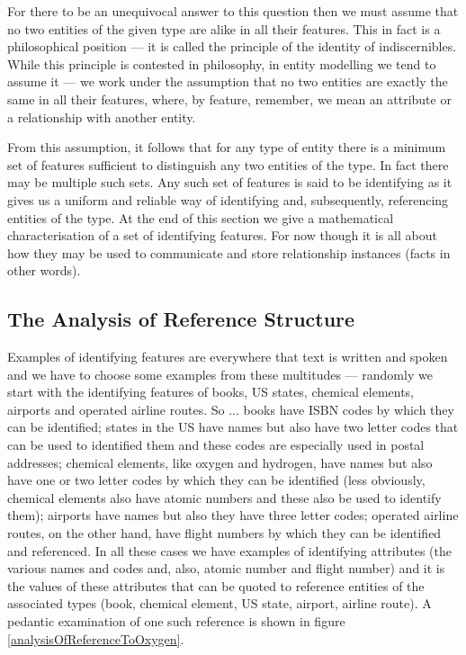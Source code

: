 For there to be an unequivocal answer to this question then we must assume that no two entities of the given type are alike in all their features. This in fact  is a philosophical position 
--- it is called the principle of the identity of indiscernibles. 
While this principle is contested in philosophy, in entity modelling we tend to assume it --- we work under the assumption that no two entities are exactly the same in all their features, where, by feature, remember, we mean an attribute or a relationship with another entity. 

From this assumption, it follows that for any type of entity there is a minimum set of features sufficient to distinguish any two entities of the type. In fact there may be multiple such sets. 
Any such set of features is said to be identifying as it gives us 
a uniform and reliable way of identifying and, subsequently, referencing entities of the type. At the end of this section we give a mathematical characterisation of a set of identifying features. For now though it is all about how they may be used to communicate and store relationship instances (facts in  other words).
\subsection{The Analysis of Reference Structure}
\mynote
Examples of identifying features are everywhere that text is written and spoken and we have to choose some examples from these multitudes
--- randomly we start with the identifying features of books, US states, chemical elements, airports and operated airline routes. 
So ... books have ISBN codes by which they can be identified; 
states in the US have names but also have two letter codes that can be used to identified them and these codes are especially used in postal addresses; chemical elements, like oxygen and hydrogen, have names but also have one or two letter codes by which they can be identified
(less obviously, chemical elements also have atomic numbers and these also be used to identify them); airports have names but also they have three letter codes; operated airline routes, on the other hand, 
have flight numbers by which they can be identified and referenced.
In all these cases we have examples of identifying attributes (the various names and codes and, also, atomic number and flight number) 
and it is the values of these attributes that can be quoted to reference entities of the associated types
(book, chemical element, US state, airport, airline route). A pedantic examination of one such reference is shown in figure \ref{analysisOfReferenceToOxygen}.


